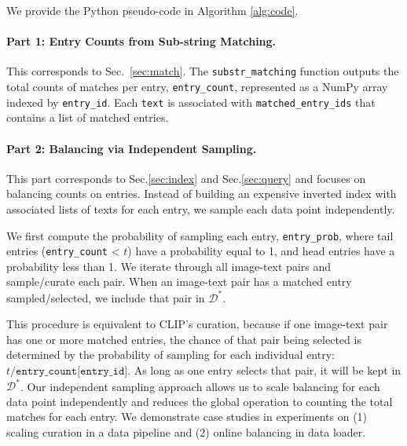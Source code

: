 \documentclass{article} %
\begin{document}
We provide the Python pseudo-code in Algorithm \ref{alg:code}.

\paragraph{Part 1: Entry Counts from Sub-string Matching.}
This corresponds to Sec.~\ref{sec:match}. The \texttt{substr\_matching} function outputs the total counts of matches per entry, \texttt{entry\_count}, represented as a NumPy array indexed by \texttt{entry\_id}.
Each \texttt{text} is associated with \texttt{matched\_entry\_ids} that contains a list of matched entries. 

\paragraph{Part 2: Balancing via Independent Sampling.}
This part corresponds to Sec.\ref{sec:index} and Sec.\ref{sec:query} and focuses on balancing counts on entries. Instead of building an expensive inverted index with associated lists of texts for each entry, we sample each data point independently. 

We first compute the probability of sampling each entry, \texttt{entry\_prob}, where tail entries (\texttt{entry\_count} < $t$) have a probability equal to 1, and head entries have a probability less than 1. We iterate through all image-text pairs and sample/curate each pair. When an image-text pair has a matched entry sampled/selected, we include that pair in $\mathcal{D}^*$. 

This procedure is equivalent to CLIP's curation, because if one image-text pair has one or more matched entries, the chance of that pair being selected is determined by the probability of sampling for each individual entry: $t/\texttt{entry\_count[entry\_id]}$. As long as one entry selects that pair, it will be kept in $\mathcal{D}^*$. Our independent sampling approach allows us to scale balancing for each data point independently and reduces the global operation to counting the total matches for each entry. We demonstrate case studies in experiments on (1) scaling curation in a data pipeline and (2) online balancing in data loader.
    
\end{document}

